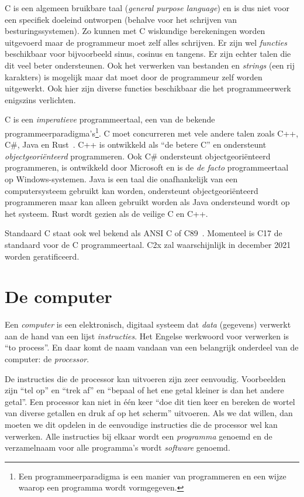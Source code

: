 C is een algemeen bruikbare taal (\textsl{general purpose language}) en is dus niet voor een specifiek doeleind ontworpen (behalve voor het schrijven van besturingssystemen). Zo kunnen met C wiskundige berekeningen worden uitgevoerd maar de programmeur moet zelf alles schrijven. Er zijn wel \textsl{functies} beschikbaar voor bijvoorbeeld sinus, cosinus en tangens. Er zijn echter talen die dit veel beter ondersteunen. Ook het verwerken van bestanden en \textsl{strings} (een rij karakters) is mogelijk maar dat moet door de programmeur zelf worden uitgewerkt. Ook hier zijn diverse functies beschikbaar die het programmeerwerk enigszins verlichten.

C is een \textsl{imperatieve} programmeertaal, een van de bekende programmeerparadigma's\footnote{Een programmeerparadigma is een manier van programmeren en een wijze waarop een programma wordt vormgegeven.}.
C moet concurreren met vele andere talen zoals C++, C\#, Java en Rust~\cite{rust}. C++ is ontwikkeld als ``de betere C'' en ondersteunt \textsl{objectgeoriënteerd} programmeren. Ook C\# ondersteunt objectgeoriënteerd programmeren, is ontwikkeld door Microsoft en is de \textsl{de facto} programmeertaal op Windows-systemen. Java is een taal die onafhankelijk van een computersysteem gebruikt kan worden, ondersteunt objectgeoriënteerd programmeren maar kan alleen gebruikt worden als Java ondersteund wordt op het systeem. Rust wordt gezien als de veilige C en C++.

Standaard C staat ook wel bekend als ANSI C of C89~\cite{1989programming}. Momenteel is C17 de standaard voor de C programmeertaal. C2x zal waarschijnlijk in december 2021 worden geratificeerd.


\section{De computer}
Een \textsl{computer} is een elektronisch, digitaal systeem dat \textsl{data} (gegevens) verwerkt aan de hand van een lijst \textsl{instructies}. Het Engelse werkwoord voor verwerken is ``to process''. En daar komt de naam vandaan van een belangrijk onderdeel van de computer: de \textsl{processor}. 

De instructies die de processor kan uitvoeren zijn zeer eenvoudig. Voorbeelden zijn ``tel op'' en ``trek af'' en ``bepaal of het ene getal kleiner is dan het andere getal''. Een processor kan niet in één keer ``doe dit tien keer en bereken de wortel van diverse getallen en druk af op het scherm'' uitvoeren. Als we dat willen, dan moeten we dit opdelen in de eenvoudige instructies die de processor wel kan verwerken. Alle instructies bij elkaar wordt een \textsl{programma} genoemd en de verzamelnaam voor alle programma's wordt \textsl{software} genoemd.

